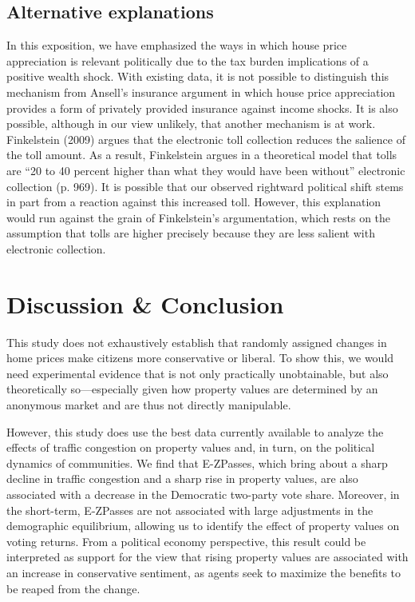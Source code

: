 \documentclass[11.0pt]{article}
\theoremstyle{definition}
\begin{document}
\subsection{Alternative explanations}
In this exposition, we have emphasized the ways in which house price appreciation is relevant politically due to the tax burden implications of a positive wealth shock. With existing data, it is not possible to distinguish this mechanism from Ansell's insurance argument in which house price appreciation provides a form of privately provided insurance against income shocks. It is also possible, although in our view unlikely, that another mechanism is at work. Finkelstein (2009) argues that the electronic toll collection reduces the salience of the toll amount. As a result, Finkelstein argues in a theoretical model that tolls are ``20 to 40 percent higher than what they would have been without'' electronic collection (p. 969). It is possible that our observed rightward political shift stems in part from a reaction against this increased toll. However, this explanation would run against the grain of Finkelstein's argumentation, which rests on the assumption that tolls are higher precisely because they are less salient with electronic collection. 

\clearpage 
\section{Discussion \& Conclusion}
This study does not exhaustively establish that randomly assigned changes in home prices make citizens more conservative or liberal. To show this, we would need experimental evidence that is not only practically unobtainable, but also theoretically so---especially given how property values are determined by an anonymous market and are thus not directly manipulable.

However, this study does use the best data currently available to analyze the effects of traffic congestion on property values and, in turn, on the political dynamics of communities. We find that E-ZPasses, which bring about a sharp decline in traffic congestion and a sharp rise in property values, are also associated with a decrease in the Democratic two-party vote share. Moreover, in the short-term, E-ZPasses are not associated with large adjustments in the demographic equilibrium, allowing us to identify the effect of property values on voting returns. From a political economy perspective, this result could be interpreted as support for the view that rising property values are associated with an increase in conservative sentiment, as agents seek to maximize the benefits to be reaped from the change.
\end{document}
